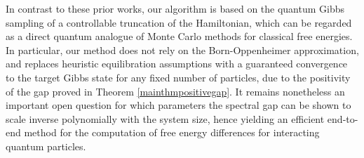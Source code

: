 \documentclass[11pt]{amsart}
\newcommand{\1}{\mathbbm{1}}
\theoremstyle{plain}
\theoremstyle{definition}
\theoremstyle{remark}
\numberwithin{equation}{section}
\begin{document}
In contrast to these prior works, our algorithm is based on the quantum Gibbs sampling of a controllable truncation of the Hamiltonian, which can be regarded as a direct quantum analogue of Monte Carlo methods for classical free energies. In particular, our method does not rely on the Born-Oppenheimer approximation, and replaces heuristic equilibration assumptions with a guaranteed convergence to the target Gibbs state for any fixed number of particles, due to the positivity of the gap proved in Theorem \ref{mainthmpositivegap}. It remains nonetheless an important open question for which parameters the spectral gap can be shown to scale inverse polynomially with the system size, hence yielding an efficient end-to-end method for the computation of free energy differences for interacting quantum particles. 









































































\end{document}
